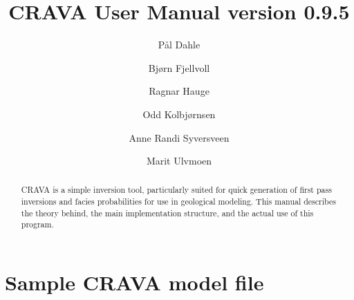\documentclass[screen,note,long,backref,indentpar]{nrdoc}
\title{CRAVA User Manual version 0.9.5}
\author{P{\aa}l Dahle\and Bj{\o}rn Fjellvoll\and Ragnar Hauge\and Odd Kolbj{\o}rnsen\and Anne Randi Syversveen\and Marit Ulvmoen }
\newcommand{\crava} {\textsf{CRAVA}\xspace}
\begin{document}
\maketitle

\begin{abstract}
CRAVA is a simple inversion tool, particularly suited for quick generation of first pass inversions and facies probabilities for use in geological modeling. This manual describes the theory behind, the main implementation structure, and the actual use of this program.
\end{abstract}

\tableofcontents
\clearemptydoublepage



\newpage

\newpage

\newpage



\appendix


\chapter{Sample \crava model file}
\label{sec:crava-model-file}

\vspace{-2em}
\end{document}
